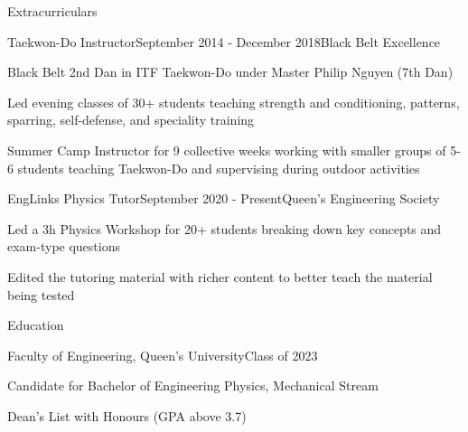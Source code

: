 \documentclass{resume} %
\begin{document}
\begin{rSection}{Extracurriculars}
\begin{rSubsection}{Taekwon-Do Instructor}{September 2014 - December 2018}{Black Belt Excellence}{}
\item Black Belt 2nd Dan in ITF Taekwon-Do under Master Philip Nguyen (7th Dan)
\item Led evening classes of 30+ students teaching strength and conditioning, patterns, sparring, self-defense, and speciality training
\item Summer Camp Instructor for 9 collective weeks working with smaller groups of 5-6 students teaching Taekwon-Do and supervising during outdoor activities

\end{rSubsection}

\begin{rSubsection}{EngLinks Physics Tutor}{September 2020 - Present}{Queen's Engineering Society}{}
\item Led a 3h Physics Workshop for 20+ students breaking down key concepts and exam-type questions
\item Edited the tutoring material with richer content to better teach the material being tested

\end{rSubsection}

\end{rSection}


\begin{rSection}{Education}

\begin{rSubsection}{Faculty of Engineering, Queen's University}{Class of 2023}{}{}
\item Candidate for Bachelor of Engineering Physics, Mechanical Stream
\item Dean's List with Honours (GPA above 3.7)
\end{rSubsection}
\end{rSection}
\end{document}

